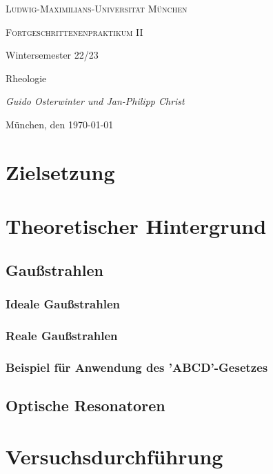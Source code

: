 \documentclass[11pt,a4paper,oneside]{scrartcl}
\begin{document}
\begin{titlepage}
	\centering
	{\scshape\LARGE Ludwig-Maximilians-Universität \linebreak München \par}
	\vspace{1cm}
	{\scshape\Large Fortgeschrittenenpraktikum II \par Wintersemester 22/23 \par}
	\vspace{1.5cm}
	{\huge\bfseries \par  Rheologie\par}
	\vspace{2cm}
	{\Large\itshape Guido Osterwinter und Jan-Philipp Christ \par}
	\vfill
	{\large München, den \today\par}
\end{titlepage}

\tableofcontents
\newpage
\section{Zielsetzung}

\section{Theoretischer Hintergrund}
\subsection{Gaußstrahlen}
\subsubsection{Ideale Gaußstrahlen}

\subsubsection{Reale Gaußstrahlen}\label{Reale Gaußstrahlen}

\subsubsection{Beispiel für Anwendung des 'ABCD'-Gesetzes}

\subsection{Optische Resonatoren}

\section{Versuchsdurchführung}
\end{document}

